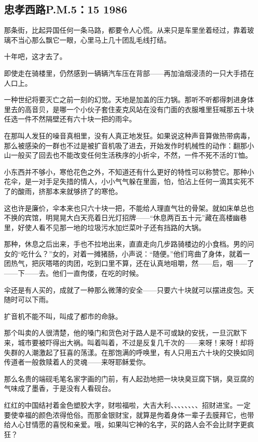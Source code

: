 \subsection{忠孝西路P.M.5：15 1986}


\par 那条街，比起异国任何一条马路，都要令人心慌。从来只是车里坐着经过，靠着玻璃不当心那么飘它一眼，心里马上几十团乱毛线打结。
\par 十年吧，这才去了。
\par 即使走在骑楼里，仍然感到一辆辆汽车压在背部——再加油烟浸渍的一只大手捂在人口上。
\par 一种世纪将要灭亡之前一刻的幻觉。天地是加盖的压力锅。那听不听都得刺进身体里去的高音贝，是哪一个小伙子套住麦克风站在没有门面的衣服堆里狂喊那五十块任选一件不然隔壁还有六十块一把的雨伞。
\par 在那叫人发狂的噪音真相里，没有人真正地发狂。如果说这种声音算做热带病毒，那么被感染的一群也不过是被扩音机吸了进去，开始发作时机械性的动作：翻那小山一般买了回去也不能改变任何生活秩序的小折伞，不然，一件不死不活的T恤。
\par 小东西并不够小，寒伧花色之外，不知道还有什么更好的特性可以称赞它。那种小花伞，是一对手足失措的情人，小小气气躲在里面，怕，怕沾上任何一滴其实死不了的酸雨，挤那本来就够挤了的寒伧。
\par 这也许是廉价，伞本来也只六十块一把，不能给人理直气壮的骨架。就如床单总也不换的宾馆，明晃晃大白天亮着日光灯招牌——“休息两百五十元”藏在高楼幽巷里，好使人看不见那一地的垃圾污水加烂菜叶子还有挡路的大锅。
\par 那种，休息之后出来，手也不拉地出来，直直走向几步路骑楼边的小食档。男的问女的“吃什么？”女的，对着一摊猪肠，小声说：“随便。”他们弯曲了身体，就着一团热气，把灰嗒嗒的肉团，吃到口里不算，还在认真地咀嚼，然——后，咽——了——下——去。他们一直佝偻，在吃的时候。
\par 伞还是有人买的，成就了一种那么微薄的安全——只要六十块就可以摆进皮包。天随时可以下雨。
\par 扩音机不能不叫，叫成了都市的命脉。
\par 那个叫卖的人很清楚，他的嗓门和货色对于路人是不可或缺的安抚，一旦沉默下来，城市要被吓得出大祸。叫着叫着，不过是反复几千次的——来呀！来呀！却将失群的人潮激起了狂喜的荡漾。在那饱满的呼唤里，有人只用五六十块的交换如同传道者一般救赎着人的灵魂——来呀耶稣爱你。
\par 那么名贵的端砚毛笔名家字画的门前，有人起劲地把一块块臭豆腐下锅，臭豆腐的气味成了墨香，于是没有人看砚台。
\par 红红的中国结衬着金色塑胶大字，财啦福啦，大吉大利、\ZhaoCaiJinBao 、\ZhaoCaiJinBao、\ZhaoCaiJinBao 、\ZhaoCaiJinBao 、\ZhaoCaiJinBao 、\ZhaoCaiJinBao 、\ZhaoCaiJinBao 、招财进宝。一定要使幸福的颜色浓得伧俗。而那金银财宝，就算是佝着身体一辈子去膜拜它，也带给人心甘情愿的喜悦和亲爱。哦，如果叫它神的名字，买的路人会不会比财字更疯狂？
